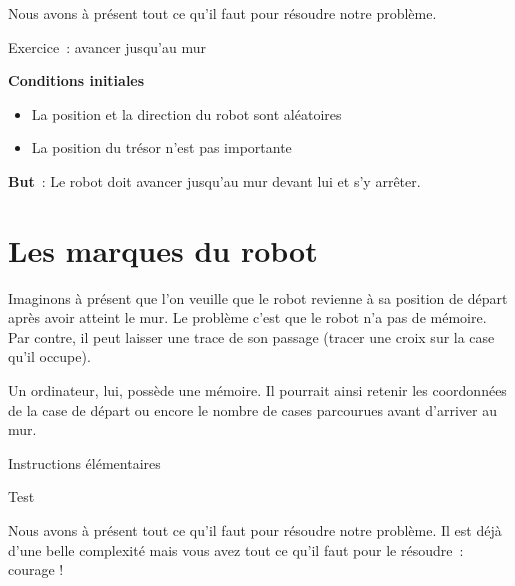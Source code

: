 	Nous avons à présent tout ce qu'il faut pour résoudre
	notre problème.

	
	\begin{Emphase}[exercice]{Exercice~: avancer jusqu'au mur}

		\textbf{Conditions initiales}

		\begin{itemize}
		\item La position et la direction du robot sont aléatoires
		\item La position du trésor n'est pas importante
		\end{itemize}
		
		\textbf{But}~: Le robot doit avancer jusqu'au mur
		devant lui et s'y arrêter.

	\end{Emphase}

\section{Les marques du robot}

	Imaginons à présent que l'on veuille que le robot
	revienne à sa position de départ après avoir atteint le mur. Le
	problème c'est que le robot n'a pas
	de mémoire. Par contre, il peut laisser une trace de son passage
	(tracer une croix sur la case qu'il occupe).
	
	Un ordinateur, lui, possède une mémoire. Il pourrait ainsi retenir les
	coordonnées de la case de départ ou encore le nombre de cases
	parcourues avant d'arriver au mur.

	
	\begin{Emphase}[definition]{Instructions élémentaires}
	\end{Emphase}

	\begin{Emphase}{Test}
	\end{Emphase}

	Nous avons à présent tout ce qu'il faut pour résoudre
	notre problème. Il est déjà d'une belle complexité
	mais vous avez tout ce qu'il faut pour le résoudre~:
	courage !

